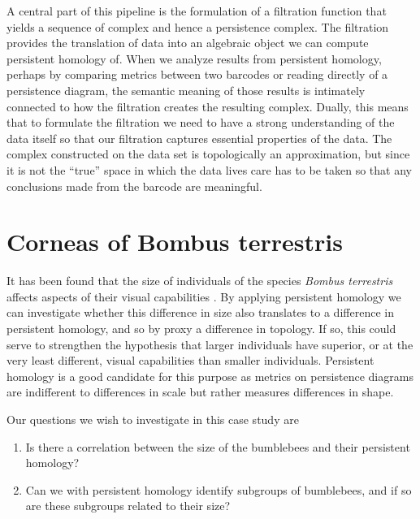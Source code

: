 A central part of this pipeline is the formulation of a filtration function that yields a sequence of complex and hence a persistence complex. The filtration provides the translation of data into an algebraic object we can compute persistent homology of. When we analyze results from persistent homology, perhaps by comparing metrics between two barcodes or reading directly of a persistence diagram, the semantic meaning of those results is intimately connected to how the filtration creates the resulting complex. Dually, this means that to formulate the filtration we need to have a strong understanding of the data itself so that our filtration captures essential properties of the data. The complex constructed on the data set is topologically an approximation, but since it is not the ``true'' space in which the data lives care has to be taken so that any conclusions made from the barcode are meaningful.


\section{Corneas of Bombus terrestris}
It has been found that the size of individuals of the species \textit{Bombus terrestris} affects aspects of their visual capabilities \cite{emily}. By applying persistent homology we can investigate whether this difference in size also translates to a difference in persistent homology, and so by proxy a difference in topology. If so, this could serve to strengthen the hypothesis that larger individuals have superior, or at the very least different, visual capabilities than smaller individuals. Persistent homology is a good candidate for this purpose as metrics on persistence diagrams are indifferent to differences in scale but rather measures differences in shape.

Our questions we wish to investigate in this case study are
\begin{enumerate}
  \item Is there a correlation between the size of the bumblebees and their persistent homology?
  \item Can we with persistent homology identify subgroups of bumblebees, and if so are these subgroups related to their size?

\end{enumerate}
